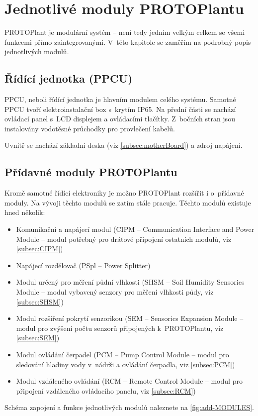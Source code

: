 \chapter{Jednotlivé moduly PROTOPlantu}
PROTOPlant je modulární systém -- není tedy jedním velkým celkem se všemi funkcemi přímo zaintegrovanými.
V~této kapitole se zaměřím na podrobný popis jednotlivých modulů.

\section{Řídící jednotka (PPCU)}
PPCU, neboli řídící jednotka je hlavním modulem celého systému.
Samotné PPCU tvoří elektroinstalační box s~krytím IP65.
Na přední části se nachází ovládací panel s~LCD displejem a ovládacími tlačítky.
Z~bočních stran jsou instalovány vodotěsné průchodky pro provlečení kabelů.

Uvnitř se nachází základní deska (viz \autoref{subsec:motherBoard}) a zdroj napájení.

\section{Přídavné moduly PROTOPlantu}
Kromě samotné řídící elektroniky je možno PROTOPlant rozšířit i o~přídavné moduly. 
Na vývoji těchto modulů se zatím stále pracuje.
Těchto modulů existuje hned několik:

\begin{itemize}
    \item Komunikační a napájecí modul (CIPM -- Communication Interface and Power Module -- modul potřebný pro drátové připojení ostatních modulů, viz \autoref{subsec:CIPM})
    \item Napájecí rozdělovač (PSpl -- Power Splitter)
    \item Modul určený pro měření půdní vlhkosti (SHSM -- Soil Humidity Sensorics Module -- modul vybavený senzory pro měření vlhkosti půdy, viz \autoref{subsec:SHSM})
    \item Modul rozšíření pokrytí senzorikou (SEM -- Sensorics Expansion Module -- modul pro zvýšení počtu senzorů připojených k~PROTOPlantu, viz \autoref{subsec:SEM})
    \item Modul ovládání čerpadel (PCM -- Pump Control Module -- modul pro sledování hladiny vody v~nádrži a ovládání čerpadla, viz \autoref{subsec:PCM})
    \item Modul vzdáleného ovládání (RCM -- Remote Control Module -- modul pro připojení vzdáleného ovládacího panelu, viz \autoref{subsec:RCM})
\end{itemize}
Schéma zapojení a funkce jednotlivých modulů naleznete na \autoref{fig:add-MODULES}.


